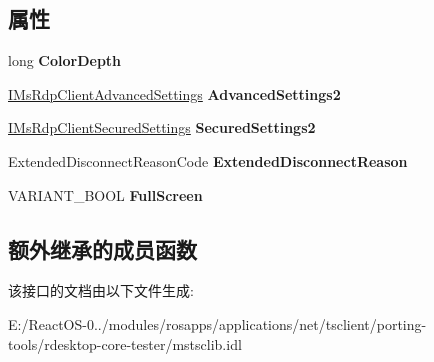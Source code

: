 \subsection*{属性}
\begin{DoxyCompactItemize}
\item 
\mbox{\label{interface_m_s_t_s_c_lib_1_1_i_ms_rdp_client_a5d02d69e45760c06c0787db0938f9e78}} 
long {\bfseries Color\+Depth}
\item 
\mbox{\label{interface_m_s_t_s_c_lib_1_1_i_ms_rdp_client_ae4df2d8d24b5e83658cebe64dbac895a}} 
\hyperlink{interface_m_s_t_s_c_lib_1_1_i_ms_rdp_client_advanced_settings}{I\+Ms\+Rdp\+Client\+Advanced\+Settings} {\bfseries Advanced\+Settings2}
\item 
\mbox{\label{interface_m_s_t_s_c_lib_1_1_i_ms_rdp_client_af08e03be31e618852cebcdc5d1d6421d}} 
\hyperlink{interface_m_s_t_s_c_lib_1_1_i_ms_rdp_client_secured_settings}{I\+Ms\+Rdp\+Client\+Secured\+Settings} {\bfseries Secured\+Settings2}
\item 
\mbox{\label{interface_m_s_t_s_c_lib_1_1_i_ms_rdp_client_ab35d48fd8fcdde0451a6567c97881e25}} 
Extended\+Disconnect\+Reason\+Code {\bfseries Extended\+Disconnect\+Reason}
\item 
\mbox{\label{interface_m_s_t_s_c_lib_1_1_i_ms_rdp_client_a97cd5593084f03f0ef8c4b12fa976122}} 
V\+A\+R\+I\+A\+N\+T\+\_\+\+B\+O\+OL {\bfseries Full\+Screen}
\end{DoxyCompactItemize}
\subsection*{额外继承的成员函数}


该接口的文档由以下文件生成\+:\begin{DoxyCompactItemize}
\item 
E\+:/\+React\+O\+S-\/0../modules/rosapps/applications/net/tsclient/porting-\/tools/rdesktop-\/core-\/tester/mstsclib.\+idl\end{DoxyCompactItemize}
